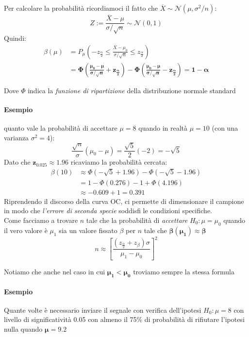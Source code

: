\documentclass[]{article}
\begin{document}
    Per calcolare la probabilità ricordiamoci il fatto che $\overline{X} \sim \mathcal{N}(\mu, \sigma^2 / n)$:
    \[ Z := \frac{\overline{X} - \mu}{\sigma / \sqrt{n}} \sim \mathcal{N}(0,1) \]
    Quindi:
    \begin{equation*}
        \begin{split}
            \beta(\mu) &= P_\mu \left( -z_{\frac{\alpha}{2}} \leq \frac{\overline{X} - \mu_0}{\sigma / \sqrt{n}} \leq z_{\frac{\alpha}{2}} \right) \\
            &= \boldsymbol{\Phi \left( \frac{\mu_0 - \mu}{\sigma / \sqrt{n}} + z_{\frac{\alpha}{2}}\right) - \Phi \left( \frac{\mu_0 - \mu}{\sigma / \sqrt{n}} - z_{\frac{\alpha}{2}} \right) = 1 - \alpha}
        \end{split}
    \end{equation*}
    \centerline{Dove $\Phi$ indica la \textit{funzione di ripartizione} della distribuzione normale standard}
    \paragraph{Esempio} quanto vale la probabilità di accettare $\mu = 8$ quando in realtà $\mu = 10$ (con una varianza $\sigma^2 = 4$):
    \[ \frac{\sqrt{n}}{\sigma} (\mu_0 - \mu) = \frac{\sqrt{5}}{2} (-2) = - \sqrt{5} \]
    Dato che $\boldsymbol{z_{0.025} \approx 1.96}$ ricaviamo la probabilità cercata:
    \begin{equation*}
        \begin{split}
            \beta(10) &\approx \Phi(- \sqrt{5} + 1.96) - \Phi(- \sqrt{5} - 1.96) \\
            &= 1 - \Phi(0.276) - 1 + \Phi(4.196) \\
            &\approx -0.609 + 1 = \boldsymbol{0.391}
        \end{split}
    \end{equation*}
    Riprendendo il discorso della curva OC, ci permette di dimensionare il campione in modo che \textit{l'errore di seconda specie} soddisfi le condizioni specifiche. \\[2ex]
    Come facciamo a trovare $n$ tale che la probabilità di \textit{accettare} $H_0 : \mu = \mu_0$ quando il vero valore è $\mu_1$ sia un valore fissato $\beta$ per $n$ tale che $\boldsymbol{\beta(\mu_1) \approx \beta}$
    \[ n \approx \left[ \frac{(z_{\frac{\alpha}{2}} + z_\beta) \sigma}{\mu_1 - \mu_0} \right]^2 \]
    \centerline{Notiamo che anche nel caso in cui $\boldsymbol{\mu_1 < \mu_0}$ troviamo sempre la stessa formula}
    \paragraph{Esempio} Quante volte è necessario inviare il segnale con verifica dell'ipotesi $H_0 : \mu = 8$ con livello di significatività 0.05 con almeno il 75\% di probabilità di rifiutare l'ipotesi nulla quando $\boldsymbol{\mu = 9.2}$
\end{document}
